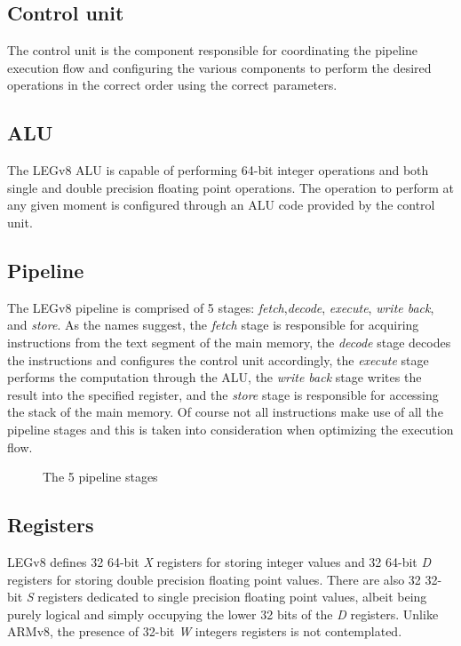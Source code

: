 \subsection*{Control unit}
The control unit is the component responsible for coordinating the pipeline execution flow and configuring the various components to perform the desired operations in the correct order using the correct parameters.
\subsection*{ALU}
The LEGv8 ALU is capable of performing 64-bit integer operations and both single and double precision floating point operations. The operation to perform at any given moment is configured through an ALU code provided by the control unit.
\subsection*{Pipeline}
The LEGv8 pipeline is comprised of 5 stages: \emph{fetch},\emph{decode}, \emph{execute}, \emph{write back}, and \emph{store}.
As the names suggest, the \emph{fetch} stage is responsible for acquiring instructions from the text segment of the main memory, the \emph{decode} stage decodes the instructions and configures the control unit accordingly, the \emph{execute} stage performs the computation through the ALU, the \emph{write back} stage writes the result into the specified register, and the \emph{store} stage is responsible for accessing the stack of the main memory.
Of course not all instructions make use of all the pipeline stages and this is taken into consideration when optimizing the execution flow.
\begin{figure}[h!]\label{fig:example}
	\centering
	\caption{The 5 pipeline stages}
\end{figure}
\subsection*{Registers}
LEGv8 defines 32 64-bit \emph{X} registers for storing integer values and 32 64-bit \emph{D} registers for storing double precision floating point values. There are also 32 32-bit \emph{S} registers dedicated to single precision floating point values, albeit being purely logical and simply occupying the lower 32 bits of the \emph{D} registers. Unlike ARMv8, the presence of 32-bit \emph{W} integers registers is not contemplated.
